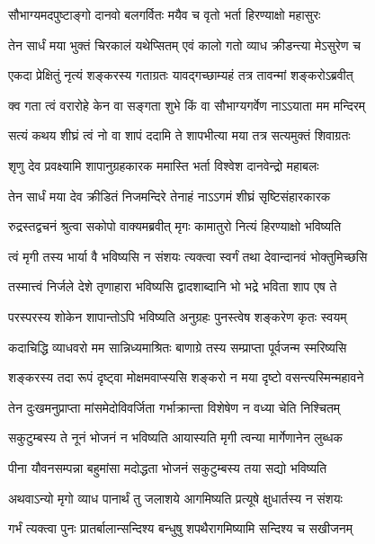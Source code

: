 \twolineshloka
{सौभाग्यमदपुष्टाङ्गो दानवो बलगर्वितः}
{मयैव च वृतो भर्ता हिरण्याक्षो महासुरः}%

\twolineshloka
{तेन सार्धं मया भुक्तं चिरकालं यथेप्सितम्}
{एवं कालो गतो व्याध क्रीडन्त्या मेऽसुरेण च}%

\twolineshloka
{एकदा प्रेक्षितुं नृत्यं शङ्करस्य गताग्रतः}
{यावद्गच्छाम्यहं तत्र तावन्मां शङ्करोऽब्रवीत्}%

\twolineshloka
{क्व गता त्वं वरारोहे केन वा सङ्गता शुभे}
{किं वा सौभाग्यगर्वेण नाऽऽयाता मम मन्दिरम्}%

\twolineshloka
{सत्यं कथय शीघ्रं त्वं नो वा शापं ददामि ते}
{शापभीत्या मया तत्र सत्यमुक्तं शिवाग्रतः}%

\twolineshloka
{शृणु देव प्रवक्ष्यामि शापानुग्रहकारक}
{ममास्ति भर्ता विश्वेश दानवेन्द्रो महाबलः}%

\twolineshloka
{तेन सार्धं मया देव क्रीडितं निजमन्दिरे}
{तेनाहं नाऽऽगमं शीघ्रं सृष्टिसंहारकारक}%

\twolineshloka
{रुद्रस्तद्वचनं श्रुत्वा सकोपो वाक्यमब्रवीत्}
{मृगः कामातुरो नित्यं हिरण्याक्षो भविष्यति}%

\twolineshloka
{त्वं मृगी तस्य भार्या वै भविष्यसि न संशयः}
{त्यक्त्वा\footnotemark{} स्वर्गं तथा देवान्दानवं भोक्तुमिच्छसि}%

\twolineshloka
{तस्मात्त्वं निर्जले देशे तृणाहारा भविष्यसि}
{द्वादशाब्दानि भो भद्रे भविता शाप एष ते}%

\twolineshloka
{परस्परस्य शोकेन शापान्तोऽपि भविष्यति}
{अनुग्रहः पुनस्त्वेष शङ्करेण कृतः स्वयम्}%

\twolineshloka
{कदाचिद्धि व्याधवरो मम सान्निध्यमाश्रितः}
{बाणाग्रे तस्य सम्प्राप्ता पूर्वजन्म स्मरिष्यसि}%

\twolineshloka
{शङ्करस्य तदा रूपं दृष्ट्वा मोक्षमवाप्स्यसि}
{शङ्करो न मया दृष्टो वसन्त्यस्मिन्महावने}%

\twolineshloka
{तेन दुःखमनुप्राप्ता मांसमेदोविवर्जिता}
{गर्भाक्रान्ता विशेषेण न वध्या चेति निश्चितम्}%

\twolineshloka
{सकुटुम्बस्य ते नूनं भोजनं न भविष्यति}
{आयास्यति मृगी त्वन्या मार्गेणानेन लुब्धक}%

\twolineshloka
{पीना यौवनसम्पन्ना बहुमांसा मदोद्धता}
{भोजनं सकुटुम्बस्य तया सद्यो भविष्यति}%

\twolineshloka
{अथवाऽन्यो मृगो व्याध पानार्थं तु जलाशये\footnotemark{}}
{आगमिष्यति प्रत्यूषे क्षुधार्तस्य न संशयः}%

\twolineshloka
{गर्भं त्यक्त्वा पुनः प्रातर्बालान्सन्दिश्य बन्धुषु}
{शपथैरागमिष्यामि सन्दिश्य च सखीजनम्}%

